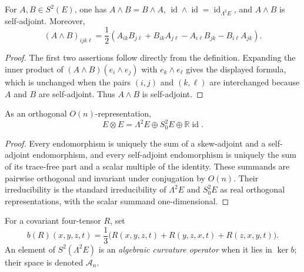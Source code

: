\begin{lemma}
  \label{lem:chow-ii-symmetric-wedge-properties}
  For \(A,B\in S^2(E)\), one has \(A\wedge B=B\wedge A\),
  \(\operatorname{id}\wedge\operatorname{id}=\operatorname{id}_{\Lambda^2E}\),
  and \(A\wedge B\) is self-adjoint.  Moreover,
  \[
  (A\wedge B)_{ijk\ell}
   =\frac12(A_{ik}B_{j\ell}+B_{ik}A_{j\ell}
                 -A_{i\ell}B_{jk}-B_{i\ell}A_{jk}).
  \]
\end{lemma}
\begin{proof}
\sketch
  The first two assertions follow directly from the definition.  Expanding
  the inner product of \((A\wedge B)(e_i\wedge e_j)\) with
  \(e_k\wedge e_\ell\) gives the displayed formula, which is unchanged when
  the pairs \((i,j)\) and \((k,\ell)\) are interchanged because \(A\) and
  \(B\) are self-adjoint.  Thus \(A\wedge B\) is self-adjoint.
\end{proof}

\begin{proposition}
  \label{prop:chow-ii-two-tensor-decomposition}
  As an orthogonal \(O(n)\)-representation,
  \[
    E\otimes E=\Lambda^2E\oplus S^2_0E\oplus\mathbb R\operatorname{id}.
  \]
\end{proposition}
\begin{proof}
\sketch
  Every endomorphism is uniquely the sum of a skew-adjoint and a
  self-adjoint endomorphism, and every self-adjoint endomorphism is uniquely
  the sum of its trace-free part and a scalar multiple of the identity.
  These summands are pairwise orthogonal and invariant under conjugation by
  \(O(n)\).  Their irreducibility is the standard irreducibility of
  \(\Lambda^2E\) and \(S^2_0E\) as real orthogonal representations, with the
  scalar summand one-dimensional.
\end{proof}

\begin{definition}
  \label{def:chow-ii-bianchi-map}
  For a covariant four-tensor \(R\), set
  \[
    b(R)(x,y,z,t)=\frac13\bigl(R(x,y,z,t)+R(y,z,x,t)+R(z,x,y,t)\bigr).
  \]
  An element of \(S^2(\Lambda^2E)\) is an \emph{algebraic curvature
  operator} when it lies in \(\ker b\); their space is denoted \(\mathcal A_n\).
\end{definition}

